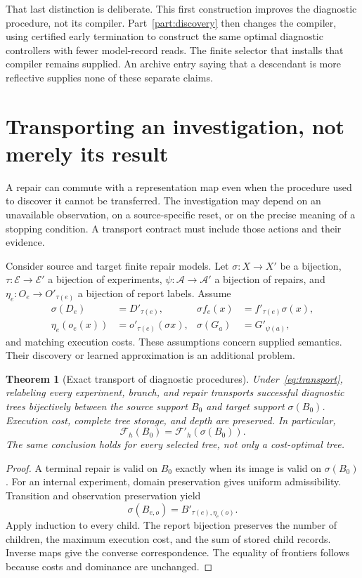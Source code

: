 \documentclass[11pt,letterpaper]{article}
\theoremstyle{plain}
\newtheorem{theorem}{Theorem}[section]
\theoremstyle{definition}
\begin{document}
That last distinction is deliberate. This first construction improves the diagnostic procedure, not its compiler. Part~\ref{part:discovery} then changes the compiler, using certified early termination to construct the same optimal diagnostic controllers with fewer model-record reads. The finite selector that installs that compiler remains supplied. An archive entry saying that a descendant is more reflective supplies none of these separate claims.

\section{Transporting an investigation, not merely its result}\label{sec:transport}
A repair can commute with a representation map even when the procedure used to discover it cannot be transferred. The investigation may depend on an unavailable observation, on a source-specific reset, or on the precise meaning of a stopping condition. A transport contract must include those actions and their evidence.

Consider source and target finite repair models. Let $\sigma:X\to X'$ be a bijection, $\tau:\mathcal E\to\mathcal E'$ a bijection of experiments, $\psi:\mathcal A\to\mathcal A'$ a bijection of repairs, and $\eta_e:O_e\to O'_{\tau(e)}$ a bijection of report labels. Assume
\begin{align}\label{eq:transport}
\sigma(D_e)&=D'_{\tau(e)}, &
\sigma f_e(x)&=f'_{\tau(e)}\sigma(x),\\
\eta_e(o_e(x))&=o'_{\tau(e)}(\sigma x), &
\sigma(G_a)&=G'_{\psi(a)},\nonumber
\end{align}
and matching execution costs. These assumptions concern supplied semantics. Their discovery or learned approximation is an additional problem.

\begin{theorem}[Exact transport of diagnostic procedures]\label{thm:transport}
Under~\eqref{eq:transport}, relabeling every experiment, branch, and repair transports successful diagnostic trees bijectively between the source support $B_0$ and target support $\sigma(B_0)$. Execution cost, complete tree storage, and depth are preserved. In particular,
\[
\mathcal F_h(B_0)=\mathcal F'_h(\sigma(B_0)).
\]
The same conclusion holds for every selected tree, not only a cost-optimal tree.
\end{theorem}
\begin{proof}
A terminal repair is valid on $B_0$ exactly when its image is valid on $\sigma(B_0)$. For an internal experiment, domain preservation gives uniform admissibility. Transition and observation preservation yield
\[
\sigma(B_{e,o})=B'_{\tau(e),\eta_e(o)}.
\]
Apply induction to every child. The report bijection preserves the number of children, the maximum execution cost, and the sum of stored child records. Inverse maps give the converse correspondence. The equality of frontiers follows because costs and dominance are unchanged.
\end{proof}
\end{document}
